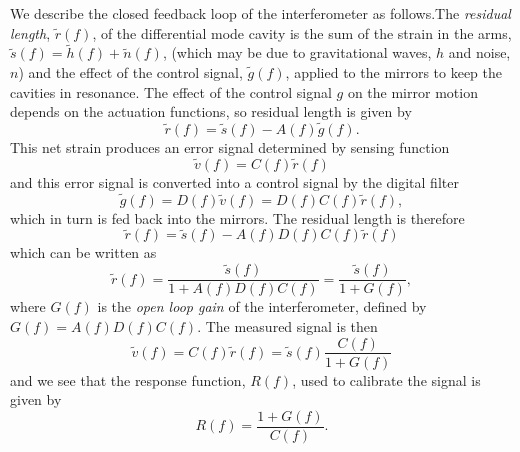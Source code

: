 We describe the closed feedback loop of the interferometer as follows.The
\emph{residual length}, $\tilde{r}(f)$, of the differential mode cavity is the
sum of the strain in the arms, $\tilde{s}(f) = \tilde{h}(f) + \tilde{n}(f)$,
(which may be due to gravitational waves, $h$ and noise, $n$) and the effect
of the control signal, $\tilde{g}(f)$, applied to the mirrors to keep the
cavities in resonance. The effect of the control signal $g$ on the mirror
motion depends on the actuation functions, so residual length is given by
\begin{equation}
\tilde{r}(f) = \tilde{s}(f) - A(f)\tilde{g}(f).
\end{equation}
This net strain produces an error signal determined by sensing function
\begin{equation}
\tilde{v}(f) = C(f) \tilde{r}(f)
\end{equation}
and this error signal is converted into a control signal by the digital filter 
\begin{equation}
\tilde{g}(f) = D(f) \tilde{v}(f) = D(f) C(f) \tilde{r}(f),
\end{equation}
which in turn is fed back into the mirrors. The residual length is therefore
\begin{equation}
\tilde{r}(f) = \tilde{s}(f) - A(f)D(f)C(f) \tilde{r}(f)
\end{equation}
which can be written as
\begin{equation}
\tilde{r}(f) = \frac{\tilde{s}(f)}{1 + A(f)D(f)C(f)} = \frac{\tilde{s}(f)}{1 + G(f)},
\end{equation}
where $G(f)$ is the \emph{open loop gain} of the interferometer, defined by
$G(f) = A(f)D(f)C(f)$. The measured signal is then
\begin{equation}
\tilde{v}(f) = C(f) \tilde{r}(f) = \tilde{s}(f) \frac{C(f)}{1 + G(f)}
\end{equation}
and we see that the response function, $R(f)$, used to calibrate the signal is
given by
\begin{equation}
R(f) = \frac{1 + G(f)}{C(f)}.
\end{equation}

